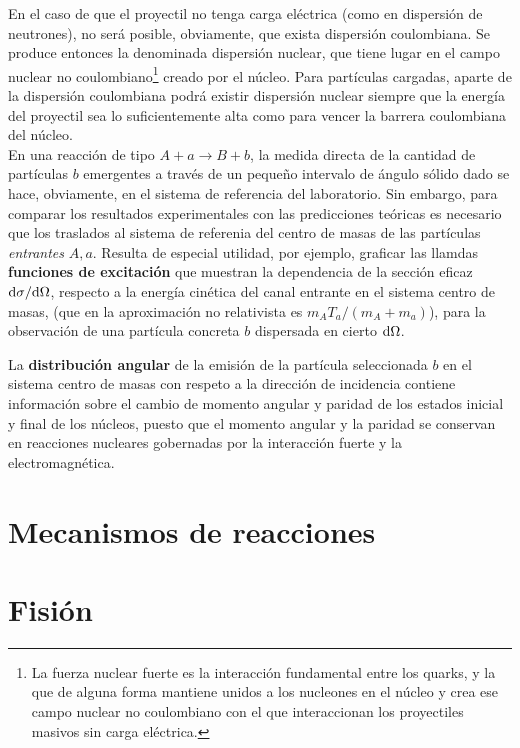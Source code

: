 En el caso de que el proyectil no tenga carga eléctrica (como en dispersión de neutrones), no será posible, obviamente, que exista dispersión coulombiana. Se produce entonces la denominada dispersión nuclear, que tiene lugar en el campo nuclear no coulombiano\footnote{La fuerza nuclear fuerte es la interacción fundamental entre los quarks, y la que de alguna forma mantiene unidos a los nucleones en el núcleo y crea ese campo nuclear no coulombiano con el que interaccionan los proyectiles masivos sin carga eléctrica.} creado por el núcleo. Para partículas cargadas, aparte de la dispersión coulombiana podrá existir dispersión nuclear siempre que la energía del proyectil sea lo suficientemente alta como para vencer la barrera coulombiana del núcleo. \\


En una reacción de tipo $A+a\longrightarrow B+b$, la medida directa de la cantidad de partículas $b$ emergentes a través de un pequeño intervalo de ángulo sólido dado se hace, obviamente, en el sistema de referencia del laboratorio. Sin  embargo, para comparar los resultados experimentales con las predicciones teóricas es necesario que los traslados al sistema de referenia del centro de masas de las partículas \textit{entrantes} $A,a$. Resulta de especial utilidad, por ejemplo, graficar las llamdas \textbf{funciones de excitación} que muestran la dependencia de la sección eficaz $\mathrm{d} \sigma / \mathrm{d} \Omega$, respecto a la energía cinética del canal entrante en el sistema centro de masas, (que en la aproximación no relativista es $m_A T_a / (m_A + m_a)$), para la observación de una partícula concreta $b$ dispersada en cierto $\mathrm{d} \Omega$. 

La \textbf{distribución angular} de la emisión de la partícula seleccionada $b$ en el sistema centro de masas con respeto a la dirección de incidencia contiene información sobre el cambio de momento angular y paridad de los estados inicial y final de los núcleos, puesto que el momento angular y la paridad se conservan en reacciones nucleares gobernadas por la interacción fuerte y la electromagnética.



\section{Mecanismos de reacciones}

\section{Fisión}

